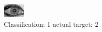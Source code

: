 \begin{figure}[h!]
\begin{center}
\includegraphics[width=0.60\columnwidth]{figures/ID2014_class_1_target_2.png}
\end{center}
\caption{ Classification: 1 actual target: 2}
\label{fig:ID2014_class_1_target_2}
\end{figure}
